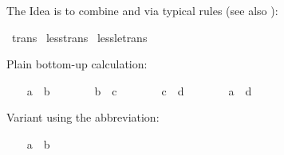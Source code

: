 \begin{isabellebody}
\isamarkuptrue%
%
\isamarkuptrue%
%
\begin{isamarkuptext}%
The Idea is to combine  and 
  via typical  rules (see also \hyperlink{command.print-trans-rules}{\mbox{}}):%
\end{isamarkuptext}%
\isamarkuptrue%
\isamarkupfalse%
\ trans\isanewline
{}\isamarkupfalse%
\ less{}trans\isanewline
{}\isamarkupfalse%
\ less{}le{}trans\isanewline
\isanewline
{}\isamarkupfalse%
\isanewline
{}%
\isadelimproof
%
\endisadelimproof
%
\isatagproof
%
\begin{isamarkuptxt}%
Plain bottom-up calculation:%
\end{isamarkuptxt}%
\isamarkuptrue%
\ \ \isamarkupfalse%
\ {}a\ {}\ b{}\ \isamarkupfalse%
\isanewline
\ \ \isamarkupfalse%
\isanewline
\ \ \isamarkupfalse%
\ {}b\ {}\ c{}\ \isamarkupfalse%
\isanewline
\ \ \isamarkupfalse%
\isanewline
\ \ \isamarkupfalse%
\ {}c\ {}\ d{}\ \isamarkupfalse%
\isanewline
\ \ \isamarkupfalse%
\isanewline
\ \ \isamarkupfalse%
\ {}a\ {}\ d{}\ \isamarkupfalse%
%
\begin{isamarkuptxt}%
Variant using the  abbreviation:%
\end{isamarkuptxt}%
\isamarkuptrue%
\ \ \isamarkupfalse%
\ {}a\ {}\ b{}\ \isamarkupfalse%
\isanewline
\ \ \isamarkupfalse%

\end{isabellebody}
